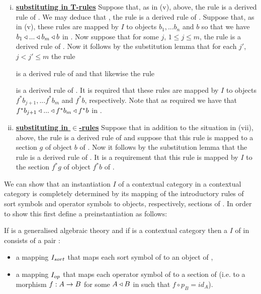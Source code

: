 \begin{definition}
\begin{enumerate}[(i)]
\item \underline{\textbf{substituting in T-rules}} 
Suppose that, as in (v), above, the rule 
 is a derived rule of \gatU.
We may deduce that \foreachj, the rule    is a derived rule of \gatU. 
Suppose that, as in (v), these rules are mapped by $I$ to objects $b_1,...b_n$ and $b$ so that
we have  $b_1 \triangleleft ... \triangleleft b_m \triangleleft b$ in \catc. Now suppose that for some $j$, $1 \leq j \leq m$, the rule
 is a derived rule of \gatU. 
Now it follows by the substitution lemma that for each $j'$, $j < j' \leq m$ the rule

 is a derived rule of \gatUw and that likewise the rule

 is a derived rule of \gatU.
It is required that these rules are mapped by $I$ to objects $f^*b_{j+1},...f^*b_m$ and $f^*b$, respectively.
Note that as required we have that $f^*b_{j+1}\triangleleft ... \triangleleft f^*b_m \triangleleft f^*b$ in \catc.

\item \underline{\textbf{substituting in $\boldsymbol {\in}$-rules}} 
Suppose that in addition to the situation in (vii), above, the rule
is a derived rule of \gatUw and suppose that this rule is mapped to a section $g$ of object $b$ of \catc.
Now it follows by the substitution lemma that the rule
is a derived rule of \gatU.
It is a requirement that this rule is mapped by $I$ to the section $f^*g$ of object $f^*b$ of \catc.
\end{enumerate}
\end{definition}

\note
We can show that an instantiation $I$ of a contextual category \gatUw in a contextual category \catcw is
completely determined by its mapping of the introductory rules of sort symbols and operator symbols to
objects, respectively, sections of \catc. In order to show this first define a preinstantiation as follows:
\begin{definition}
If \gatUw is a generalised algebraic theory  and if \catcw is a contextual category then
a  $I$ of  \gatUw in \catcw consists of a pair :
\begin{itemize}
\item a mapping $I_{sort}$ that maps each sort symbol of \gatUw to  an object of \catc,
\item a mapping $I_{op}$ that maps each operator symbol of \gatUw to a section of \catcw (i.e. to a morphism $f: A \rightarrow B$ for some 
$A \triangleleft B$ in \catcw such that $f \circ p_B=id_A$).
\end{itemize}
\end{definition}

